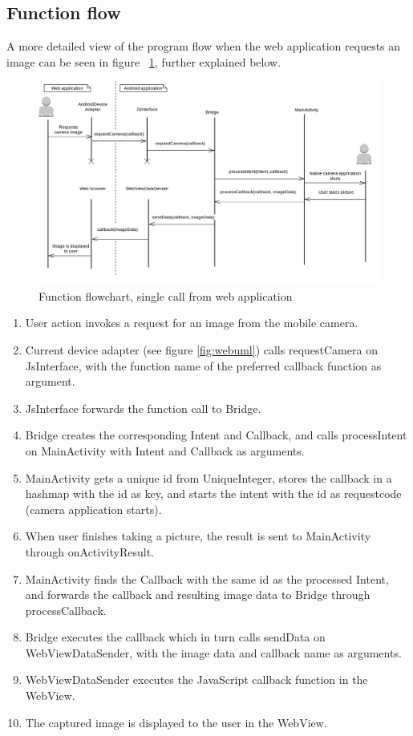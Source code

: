 \subsection{Function flow} \label{subsec:function-flow-native}
A more detailed view of the program flow when the web application requests an image can be seen in figure ~\ref{fig:nativeflow}, further explained below.
\begin{figure}[h!]
	\centering
    \includegraphics[width=150mm,natwidth=1000,natheight=750]{./img/androidfunctionflow.png}
    \caption{Function flowchart, single call from web application \label{fig:nativeflow}}
\end{figure}
\begin{enumerate}
	\item User action invokes a request for an image from the mobile camera.
	\item Current device adapter (see figure \ref{fig:webuml}) calls requestCamera on JsInterface, with the function name of the preferred callback function as argument.
	\item JsInterface forwards the function call to Bridge.
	\item Bridge creates the corresponding Intent and Callback, and calls processIntent on MainActivity with Intent and Callback as arguments.
	\item MainActivity gets a unique id from UniqueInteger, stores the callback in a hashmap with the id as key, and starts the intent with the id as requestcode (camera application starts).
	\item When user finishes taking a picture, the result is sent to MainActivity through onActivityResult.
	\item MainActivity finds the Callback with the same id as the processed Intent, and forwards the callback and resulting image data to Bridge through processCallback.
	\item Bridge executes the callback which in turn calls sendData on WebViewDataSender, with the image data and callback name as arguments.
	\item WebViewDataSender executes the JavaScript callback function in the WebView.
	\item The captured image is displayed to the user in the WebView.
\end{enumerate}

